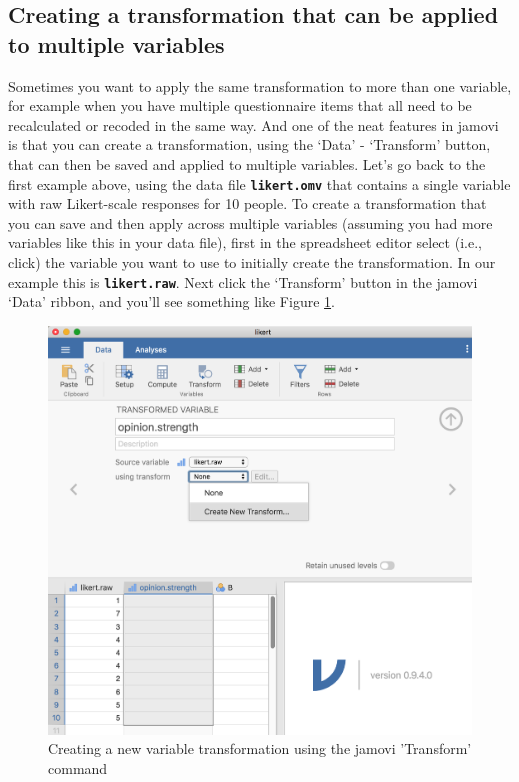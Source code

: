 \documentclass[
]{book}
\begin{document}
\hypertarget{creating-a-transformation-that-can-be-applied-to-multiple-variables}{%
\subsection{Creating a transformation that can be applied to multiple variables}\label{creating-a-transformation-that-can-be-applied-to-multiple-variables}}

Sometimes you want to apply the same transformation to more than one variable, for example when you have multiple questionnaire items that all need to be recalculated or recoded in the same way. And one of the neat features in jamovi is that you can create a transformation, using the `Data' - `Transform' button, that can then be saved and applied to multiple variables. Let's go back to the first example above, using the data file \textbf{\texttt{likert.omv}} that contains a single variable with raw Likert-scale responses for 10 people. To create a transformation that you can save and then apply across multiple variables (assuming you had more variables like this in your data file), first in the spreadsheet editor select (i.e., click) the variable you want to use to initially create the transformation. In our example this is \textbf{\texttt{likert.raw}}. Next click the `Transform' button in the jamovi `Data' ribbon, and you'll see something like Figure \ref{fig:transform1}.

\begin{figure}

{\centering \includegraphics[width=1\linewidth]{img/mechanics/transform1} 

}

\caption{Creating a new variable transformation using the jamovi 'Transform' command}\label{fig:transform1}
\end{figure}
\end{document}
